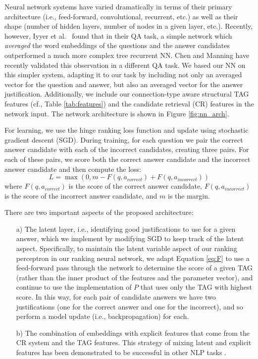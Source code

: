 {Neural network systems have varied dramatically in terms of their primary architecture (i.e., feed-forward, convolutional, recurrent, etc.) as well as their shape (number of hidden layers, number of nodes in a given layer, etc.).  Recently, however, Iyyer et al.~ found that in their QA task, a simple network which \emph{averaged} the word embeddings of the questions and the answer candidates outperformed a much more complex tree recurrent NN.  
Chen and Manning  have recently validated this observation in a different QA task.
We based our NN on this simpler system, adapting it to our task by including not only an averaged vector for the question and answer, but also an averaged vector for the answer justification.  Additionally, we include our connection-type aware structural TAG features (cf., Table \ref{tab:features}) and the candidate retrieval (CR) features in the network input.  The network architecture is shown in Figure \ref{fig:nn_arch}.

For learning, we use the hinge ranking loss function \cite{collobert2011natural} and update using stochastic gradient descent (SGD).  During training, for each question we pair the correct answer candidate with each of the incorrect candidates, creating three pairs.  For each of these pairs, we score both the correct answer candidate and the incorrect answer candidate and then compute the loss:
\begin{equation}
L = \max (0, m - F(q,a_{correct}) + F(q,a_{incorrect}))
\end{equation}
where $F(q,a_{correct})$ is the score of the correct answer candidate, $F(q,a_{incorrect})$ is the score of the incorrect answer candidate, and $m$ is the margin.


There are two important aspects of the proposed architecture:
\begin{enumerate}
\item[a)] The latent layer, i.e., identifying good justifications to use for a given answer, which we implement by modifying SGD to keep track of the latent aspect.  Specifically, to maintain the latent variable aspect of our ranking perceptron in our ranking neural network, we adapt Equation \ref{eq:F} to use a feed-forward pass through the network to determine the score of a given TAG (rather than the inner product of the features and the parameter vector), and continue to use the implementation of $P$ that uses only the TAG with highest score.  In this way, for each pair of candidate answers we have two justifications (one for the correct answer and one for the incorrect), and so perform a model update (i.e., backpropagation) for each.
\item[b)] The combination of embeddings with explicit features that come from the CR system and the TAG features.  This strategy of mixing latent and explicit features has been demonstrated to be successful in other NLP tasks \cite{chen2014fast,suggu2016deep}.
\end{enumerate} 

}
